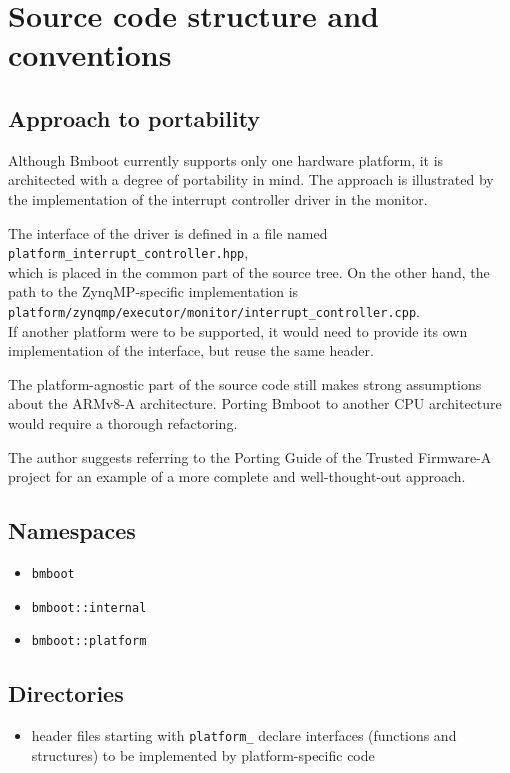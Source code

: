 \section{Source code structure and conventions}

\subsection{Approach to portability}

Although Bmboot currently supports only one hardware platform, it is architected with a degree of portability in mind. The approach is illustrated by the implementation of the interrupt controller driver in the monitor.

The interface of the driver is defined in a file named\\
\texttt{platform\_interrupt\_controller.hpp}, \\
which is placed in the common part of the source tree. On the other hand, the path to the ZynqMP-specific implementation is\\
\texttt{platform/zynqmp/executor/monitor/interrupt\_controller.cpp}. \\
If another platform were to be supported, it would need to provide its own implementation of the interface, but reuse the same header.

The platform-agnostic part of the source code still makes strong assumptions about the ARMv8-A architecture. Porting Bmboot to another CPU architecture would require a thorough refactoring.

The author suggests referring to the Porting Guide of the Trusted Firmware-A project \cite{tfa-porting-guide} for an example of a more complete and well-thought-out approach.

\subsection{Namespaces}

\begin{itemize}
    \item \texttt{bmboot}
    \item \texttt{bmboot::internal}
    \item \texttt{bmboot::platform}
\end{itemize}

\subsection{Directories}

\begin{itemize}
    \item header files starting with \texttt{platform\_} declare interfaces (functions and structures) to be implemented by platform-specific code
\end{itemize}

